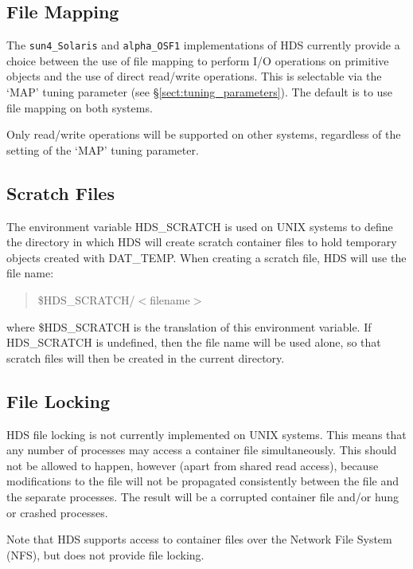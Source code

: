 \documentclass[11pt]{article}
\newcommand{\htmlref}[2]{#1}
\newcommand{\xlabel}[1]{}
\newcommand{\hi}[1]{{\tt{#1}}}
\begin{document}
\subsection{\xlabel{file_mapping}\label{sect:system_map}File Mapping}

The \hi{sun4\_Solaris} and \hi{alpha\_OSF1} implementations of HDS
currently provide a choice between the use of file mapping to perform
I/O operations on primitive objects and the use of direct read/write
operations. This is selectable via the `MAP' tuning parameter (see
\S\ref{sect:tuning_parameters}). The default is to use file mapping on
both systems.

Only read/write operations will be supported on other systems,
regardless of the setting of the `MAP' tuning parameter.

\subsection{\xlabel{scratch_files}Scratch Files}

The environment variable HDS\_SCRATCH is used on UNIX systems to
define the directory in which HDS will create scratch container files
to hold temporary objects created with
\htmlref{DAT\_TEMP}{DAT_TEMP}. When creating a scratch file, HDS will
use the file name:

\begin{quote}
\$HDS\_SCRATCH/$<$filename$>$
\end{quote}

where \$HDS\_SCRATCH is the translation of this environment
variable. If HDS\_SCRATCH is undefined, then the file name will be
used alone, so that scratch files will then be created in the current
directory.

\subsection{\xlabel{file_locking}File Locking}

HDS file locking is not currently implemented on UNIX systems. This
means that any number of processes may access a container file
simultaneously. This should not be allowed to happen, however (apart
from shared read access), because modifications to the file will not
be propagated consistently between the file and the separate
processes. The result will be a corrupted container file and/or hung
or crashed processes.

Note that HDS supports access to container files over the Network File
System (NFS), but does not provide file locking.
\end{document}
